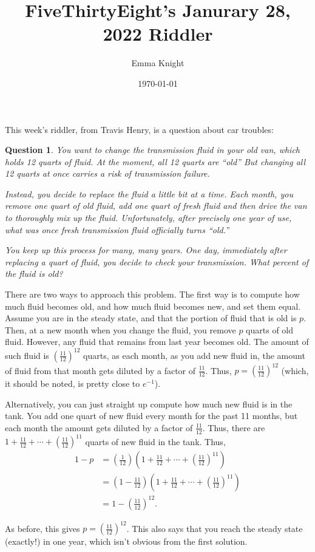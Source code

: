 \documentclass[11pt]{article}
\title{FiveThirtyEight's Janurary 28, 2022 Riddler}
\author{Emma Knight}
\date{\today}
\newtheorem{question}[theorem]{Question}
\theoremstyle{definition}
\begin{document}
\maketitle

This week's riddler, from Travis Henry, is a question about car troubles:
\begin{question}
You want to change the transmission fluid in your old van, which holds 12 quarts of fluid. At the moment, all 12 quarts are ``old'' But changing all 12 quarts at once carries a risk of transmission failure.

Instead, you decide to replace the fluid a little bit at a time. Each month, you remove one quart of old fluid, add one quart of fresh fluid and then drive the van to thoroughly mix up the fluid. Unfortunately, after precisely one year of use, what was once fresh transmission fluid officially turns ``old.''

You keep up this process for many, many years. One day, immediately after replacing a quart of fluid, you decide to check your transmission. What percent of the fluid is old?
\end{question}
There are two ways to approach this problem.  The first way is to compute how much fluid becomes old, and how much fluid becomes new, and set them equal.  Assume you are in the steady state, and that the portion of fluid that is old is $p$.  Then, at a new month when you change the fluid, you remove $p$ quarts of old fluid.  However, any fluid that remains from last year becomes old.  The amount of such fluid is $\left(\frac{11}{12}\right)^{12}$ quarts, as each month, as you add new fluid in, the amount of fluid from that month gets diluted by a factor of $\frac{11}{12}$.  Thus, $p = \left(\frac{11}{12}\right)^{12}$ (which, it should be noted, is pretty close to $e^{-1}$).

Alternatively, you can just straight up compute how much new fluid is in the tank.  You add one quart of new fluid every month for the past 11 months, but each month the amount gets diluted by a factor of $\frac{11}{12}$.  Thus, there are $1 + \frac{11}{12} + \cdots + \left(\frac{11}{12}\right)^{11}$ quarts of new fluid in the tank.  Thus, 
\begin{align*}
1-p & = \left(\frac{1}{12}\right)\left(1 + \frac{11}{12} + \cdots + \left(\frac{11}{12}\right)^{11}\right) \\
& = \left(1-\frac{11}{12}\right)\left(1 + \frac{11}{12} + \cdots + \left(\frac{11}{12}\right)^{11}\right) \\
& = 1- \left(\frac{11}{12}\right)^{12}.
\end{align*}

As before, this gives $p = \left(\frac{11}{12}\right)^{12}$.  This also says that you reach the steady state (exactly!) in one year, which isn't obvious from the first solution.
\end{document}
